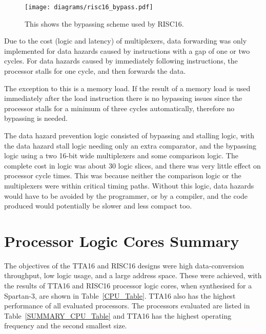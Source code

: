 \begin{figure}[h!]
\begin{center}
\texttt{[image: diagrams/risc16\_bypass.pdf]}
\caption[Data Bypassing Scheme Used by RISC16]{This shows the bypassing scheme
used by RISC16.}
\label{RISC16_Bypass}
\end{center}
\end{figure}

Due to the cost (logic and latency) of multiplexers, data forwarding was only
implemented for data hazards caused by instructions with a gap of one or two
cycles. For data hazards caused by immediately following instructions, the
processor stalls for one cycle, and then forwards the data.

The exception to this is a memory load. If the result of a memory load is used
immediately after the load instruction there is no bypassing issues since the
processor stalls for a minimum of three cycles automatically, therefore no
bypassing is needed.

The data hazard prevention logic consisted of bypassing and stalling logic, with
the data hazard stall logic needing only an extra comparator, and the bypassing
logic using a two 16-bit wide multiplexers and some comparison logic. The
complete cost in logic was about 30 logic slices, and there was very little
effect on processor cycle times. This was because neither the comparison logic or
the multiplexers were within critical timing paths. Without this logic, data
hazards would have to be avoided by the programmer, or by a compiler, and the
code produced would potentially be slower and less compact too.


\section{Processor Logic Cores Summary}
\label{CPU_Summary}

The objectives of the TTA16 and RISC16 designs were high data-conversion
throughput, low logic usage, and a large address space. These were achieved, with
the results of TTA16 and RISC16 processor logic cores, when synthesised for a
Spartan-3, are shown in Table~\ref{CPU_Table}. TTA16 also has the highest
performance of all evaluated processors. The processors evaluated are listed in
Table~\ref{SUMMARY_CPU_Table} and TTA16 has the highest operating frequency and
the second smallest size.

